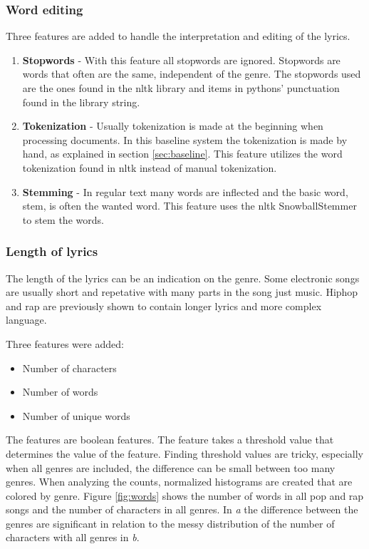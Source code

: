 \documentclass[a4paper, 12pt]{article}
\begin{document}
\subsubsection*{Word editing}
Three features are added to handle the interpretation and editing of the lyrics.
\begin{enumerate}
    \item {\textbf{Stopwords} - With this feature all stopwords are ignored.
    Stopwords are words that often are the same, independent of the genre.
    The stopwords used are the ones found in the nltk library and items in pythons' punctuation found in the library string.}
    \item {\textbf{Tokenization} - Usually tokenization is made at the beginning when processing documents.
    In this baseline system the tokenization is made by hand, as explained in section \ref{sec:baseline}.
    This feature utilizes the word tokenization found in nltk instead of manual tokenization.}
    \item {\textbf{Stemming} - In regular text many words are inflected and the basic word, stem, is often the wanted word.
    This feature uses the nltk SnowballStemmer to stem the words.}
\end{enumerate}

\subsubsection*{Length of lyrics}
The length of the lyrics can be an indication on the genre.
Some electronic songs are usually short and repetative with many parts in the song just music.
Hip\/hop and rap are previously shown to contain longer lyrics and more complex language. \cite{rap-long}

Three features were added:
\begin{itemize}
    \item {Number of characters}
    \item {Number of words}
    \item {Number of unique words}
\end{itemize}

The features are boolean features.
The feature takes a threshold value that determines the value of the feature.
Finding threshold values are tricky, especially when all genres are included, the difference can be small between too many genres.
When analyzing the counts, normalized histograms are created that are colored by genre.
Figure \ref{fig:words} shows the number of words in all pop and rap songs and the number of characters in all genres.
In \textit{a} the difference between the genres are significant in relation to the messy distribution of the number of characters with all genres in \textit{b}.
\end{document}

